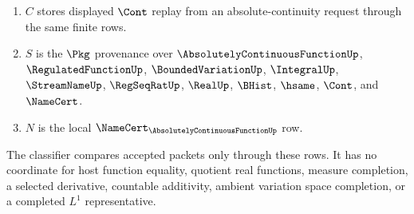 \begin{definition}
\begin{enumerate}
\item $C$ stores displayed $\Cont$ replay from an absolute-continuity request through the same finite rows.
\item $S$ is the $\Pkg$ provenance over $\AbsolutelyContinuousFunctionUp$, $\RegulatedFunctionUp$, $\BoundedVariationUp$, $\IntegralUp$, $\StreamNameUp$, $\RegSeqRatUp$, $\RealUp$, $\BHist$, $\hsame$, $\Cont$, and $\NameCert$.
\item $N$ is the local $\NameCert_{\AbsolutelyContinuousFunctionUp}$ row.
\end{enumerate}
The classifier compares accepted packets only through these rows. It has no coordinate for host function equality, quotient real functions, measure completion, a selected derivative, countable additivity, ambient variation space completion, or a completed $L^1$ representative.
\end{definition}

